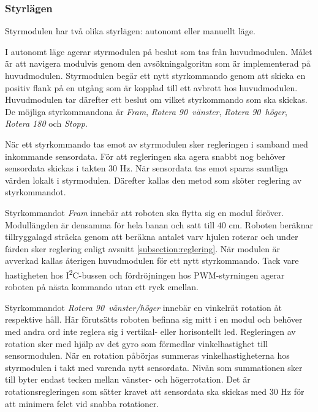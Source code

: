 \documentclass[11pt]{article}
\begin{document}
\begin{flushleft}
\subsubsection{Styrlägen}
Styrmodulen har två olika styrlägen: autonomt eller manuellt läge.
\begin{description}[style=unboxed, leftmargin=0cm]
  \item[Autonomt läge]
I autonomt läge agerar styrmodulen på beslut som tas från huvudmodulen. Målet är att navigera modulvis genom den avsökningalgoritm som är implementerad på huvudmodulen. Styrmodulen begär ett nytt styrkommando genom att skicka en positiv flank på en utgång som är kopplad till ett avbrott hos huvudmodulen. Huvudmodulen tar därefter ett beslut om vilket styrkommando som ska skickas. De möjliga styrkommandona är \textit{Fram}, \textit{Rotera 90\textdegree\ vänster}, \textit{Rotera 90\textdegree\ höger}, \textit{Rotera 180\textdegree} och \textit{Stopp}. 

När ett styrkommando tas emot av styrmodulen sker regleringen i samband med inkommande sensordata. För att regleringen ska agera snabbt nog behöver sensordata skickas i takten $30$ Hz. När sensordata tas emot sparas samtliga värden lokalt i styrmodulen. Därefter kallas den metod som sköter reglering av styrkommandot. 

Styrkommandot \textit{Fram} innebär att roboten ska flytta sig en modul föröver. Modullängden är densamma för hela banan och satt till $40$ cm. Roboten beräknar tillryggalagd sträcka genom att beräkna antalet varv hjulen roterar och under färden sker reglering enligt avsnitt \ref{subsection:reglering}. När modulen är avverkad kallas återigen huvudmodulen för ett nytt styrkommando. Tack vare hastigheten hos I\textsuperscript{2}C-bussen och fördröjningen hos PWM-styrningen agerar roboten på nästa kommando utan ett ryck emellan. 

Styrkommandot \textit{Rotera 90\textdegree\ vänster/höger} innebär en vinkelrät rotation åt respektive håll. Här förutsätts roboten befinna sig mitt i en modul och behöver med andra ord inte reglera sig i vertikal- eller horisontellt led. Regleringen av rotation sker med hjälp av det gyro som förmedlar vinkelhastighet till sensormodulen. När en rotation påbörjas summeras vinkelhastigheterna hos styrmodulen i takt med varenda nytt sensordata. Nivån som summationen sker till byter endast tecken mellan vänster- och högerrotation. Det är rotationsregleringen som sätter kravet att sensordata ska skickas med $30$ Hz för att minimera felet vid snabba rotationer. 


\end{description}
\end{flushleft}
\end{document}
